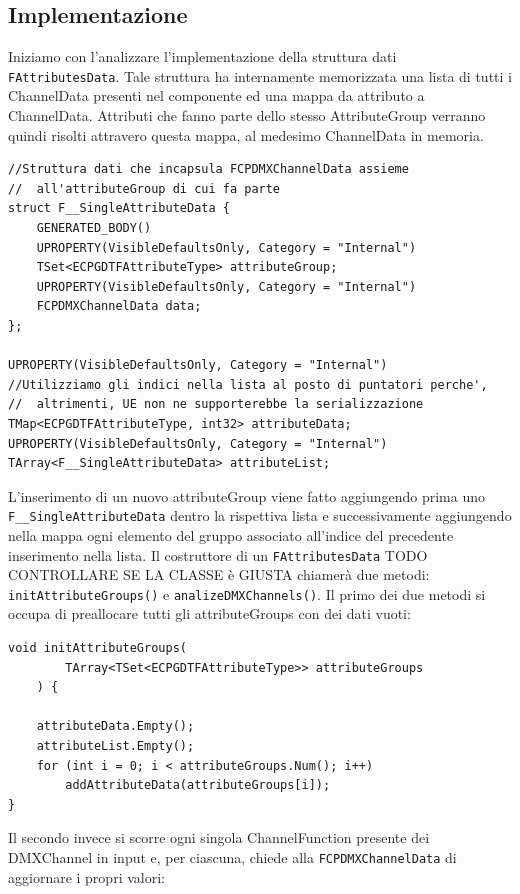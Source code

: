 \documentclass[main.tex]{subfiles}
\begin{document}
\subsection{Implementazione}\label{subsec:3_implementation}
Iniziamo con l'analizzare l'implementazione della struttura dati \lstinline{FAttributesData}. Tale struttura ha internamente memorizzata una lista di tutti i ChannelData presenti nel componente ed una mappa da attributo a ChannelData. Attributi che fanno parte dello stesso AttributeGroup verranno quindi risolti attravero questa mappa, al medesimo ChannelData in memoria.
\lstset{language=UEcpp}
\begin{lstlisting}
//Struttura dati che incapsula FCPDMXChannelData assieme
//  all'attributeGroup di cui fa parte
struct F__SingleAttributeData {
    GENERATED_BODY()
    UPROPERTY(VisibleDefaultsOnly, Category = "Internal")
    TSet<ECPGDTFAttributeType> attributeGroup;
    UPROPERTY(VisibleDefaultsOnly, Category = "Internal")
    FCPDMXChannelData data;
};

UPROPERTY(VisibleDefaultsOnly, Category = "Internal")
//Utilizziamo gli indici nella lista al posto di puntatori perche',
//  altrimenti, UE non ne supporterebbe la serializzazione
TMap<ECPGDTFAttributeType, int32> attributeData;
UPROPERTY(VisibleDefaultsOnly, Category = "Internal")
TArray<F__SingleAttributeData> attributeList;
\end{lstlisting}
L'inserimento di un nuovo attributeGroup viene fatto aggiungendo prima uno \lstinline{F__SingleAttributeData} dentro la rispettiva lista e successivamente aggiungendo nella mappa ogni elemento del gruppo associato all'indice del precedente inserimento nella lista.\newline
Il costruttore di un \lstinline{FAttributesData} TODO CONTROLLARE SE LA CLASSE è GIUSTA chiamerà due metodi: \lstinline{initAttributeGroups()} e \lstinline{analizeDMXChannels()}. Il primo dei due metodi si occupa di preallocare tutti gli attributeGroups con dei dati vuoti:
\begin{lstlisting}
void initAttributeGroups(
        TArray<TSet<ECPGDTFAttributeType>> attributeGroups
    ) {

    attributeData.Empty();
    attributeList.Empty();
    for (int i = 0; i < attributeGroups.Num(); i++)
        addAttributeData(attributeGroups[i]);
}
\end{lstlisting}
Il secondo invece si scorre ogni singola ChannelFunction presente dei DMXChannel in input e, per ciascuna, chiede alla \lstinline{FCPDMXChannelData} di aggiornare i propri valori:
\end{document}
